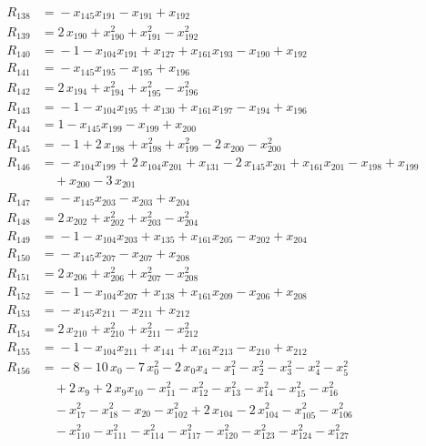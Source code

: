 \begin{align*}
R_{138} &={} -x_{145} x_{191} -x_{191} +x_{192} \\[2pt]
R_{139} &={} 2\,x_{190} +x_{190}^{2} +x_{191}^{2} -x_{192}^{2} \\[2pt]
R_{140} &={} -1 -x_{104} x_{191} +x_{127} +x_{161} x_{193} -x_{190} +x_{192} \\[2pt]
R_{141} &={} -x_{145} x_{195} -x_{195} +x_{196} \\[2pt]
R_{142} &={} 2\,x_{194} +x_{194}^{2} +x_{195}^{2} -x_{196}^{2} \\[2pt]
R_{143} &={} -1 -x_{104} x_{195} +x_{130} +x_{161} x_{197} -x_{194} +x_{196} \\[2pt]
R_{144} &={} 1 -x_{145} x_{199} -x_{199} +x_{200} \\[2pt]
R_{145} &={} -1 +2\,x_{198} +x_{198}^{2} +x_{199}^{2} -2\,x_{200} -x_{200}^{2} \\[2pt]
R_{146} &={} -x_{104} x_{199} +2\,x_{104} x_{201} +x_{131} -2\,x_{145} x_{201} +x_{161} x_{201} -x_{198} +x_{199} \\
&\quad{} +x_{200} -3\,x_{201} \\[2pt]
R_{147} &={} -x_{145} x_{203} -x_{203} +x_{204} \\[2pt]
R_{148} &={} 2\,x_{202} +x_{202}^{2} +x_{203}^{2} -x_{204}^{2} \\[2pt]
R_{149} &={} -1 -x_{104} x_{203} +x_{135} +x_{161} x_{205} -x_{202} +x_{204} \\[2pt]
R_{150} &={} -x_{145} x_{207} -x_{207} +x_{208} \\[2pt]
R_{151} &={} 2\,x_{206} +x_{206}^{2} +x_{207}^{2} -x_{208}^{2} \\[2pt]
R_{152} &={} -1 -x_{104} x_{207} +x_{138} +x_{161} x_{209} -x_{206} +x_{208} \\[2pt]
R_{153} &={} -x_{145} x_{211} -x_{211} +x_{212} \\[2pt]
R_{154} &={} 2\,x_{210} +x_{210}^{2} +x_{211}^{2} -x_{212}^{2} \\[2pt]
R_{155} &={} -1 -x_{104} x_{211} +x_{141} +x_{161} x_{213} -x_{210} +x_{212} \\[2pt]
R_{156} &={} -8 -10\,x_{0} -7\,x_{0}^{2} -2\,x_{0} x_{4} -x_{1}^{2} -x_{2}^{2} -x_{3}^{2} -x_{4}^{2} -x_{5}^{2} \\
&\quad{} +2\,x_{9} +2\,x_{9} x_{10} -x_{11}^{2} -x_{12}^{2} -x_{13}^{2} -x_{14}^{2} -x_{15}^{2} -x_{16}^{2} \\
&\quad{} -x_{17}^{2} -x_{18}^{2} -x_{20} -x_{102}^{2} +2\,x_{104} -2\,x_{104}^{2} -x_{105}^{2} -x_{106}^{2} \\
&\quad{} -x_{110}^{2} -x_{111}^{2} -x_{114}^{2} -x_{117}^{2} -x_{120}^{2} -x_{123}^{2} -x_{124}^{2} -x_{127}^{2} \\

\end{align*}
